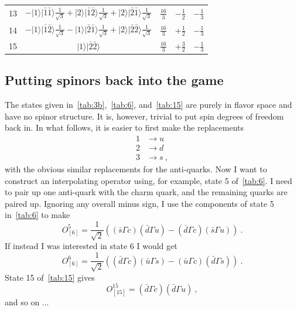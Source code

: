 \documentclass[11pt]{article}
\begin{document}
\begin{table}
\begin{tabular}{c|c|c|c|c}
13& $-|1\rangle|\bar{1}\bar{1}\rangle\frac{1}{\sqrt{3}}+|2\rangle|\bar{1}\bar{2}\rangle\frac{1}{\sqrt{3}}+|2\rangle|\bar{2}\bar{1}\rangle\frac{1}{\sqrt{3}}$ &$\frac{16}{3}$ &$-\frac{1}{2}$ & $-\frac{1}{3}$\\
14& $-|1\rangle|\bar{1}\bar{2}\rangle\frac{1}{\sqrt{3}}-|1\rangle|\bar{2}\bar{1}\rangle\frac{1}{\sqrt{3}}+|2\rangle|\bar{2}\bar{2}\rangle\frac{1}{\sqrt{3}}$ &$\frac{16}{3}$ &$+\frac{1}{2}$ & $-\frac{1}{3}$\\
15& $|1\rangle|\bar{2}\bar{2}\rangle$ &$\frac{16}{3}$ &$+\frac{3}{2}$ & $-\frac{1}{3}$\\
\hline\hline
\end{tabular}
\end{table}

\subsection{Putting spinors back into the game}
The states given in~\autoref{tab:3b},~\autoref{tab:6}, and~\autoref{tab:15} are purely in flavor space and have no spinor structure.  It is, however, trivial to put spin degrees of freedom back in.  In what follows, it is easier to first make the replacements
\begin{align*}
1&\to u\\
2&\to d\\
3&\to s\ ,
\end{align*}
with the obvious similar replacements for the anti-quarks.  Now I want to construct an interpolating operator using, for example, state 5 of~\autoref{tab:6}.  I need to pair up one anti-quark with the charm quark, and the remaining quarks are paired up.  Ignoring any overall minus sign, I use the components of state 5 in~\autoref{tab:6} to make 
\begin{equation}
O^5_{[6]}=\frac{1}{\sqrt{2}}\left(\left(\bar{s}\Gamma c\right)\left(\bar{d}\Gamma u\right)-\left(\bar{d}\Gamma c\right)\left(\bar{s}\Gamma u\right)\right)\ .
\end{equation}
If instead I was interested in state 6 I would get
\begin{equation}\label{eqn:6 interp}
O^6_{[6]}=\frac{1}{\sqrt{2}}\left(\left(\bar{d}\Gamma c\right)\left(\bar{u}\Gamma s\right)-\left(\bar{u}\Gamma c\right)\left(\bar{d}\Gamma s\right)\right)\ .
\end{equation}
State 15 of~\autoref{tab:15} gives
\begin{equation}\label{eqn:15 interp}
O^{15}_{[15]}=\left(\bar{d}\Gamma c\right)\left(\bar{d}\Gamma u\right)\ ,
\end{equation}
and so on $\ldots$
\end{document}
